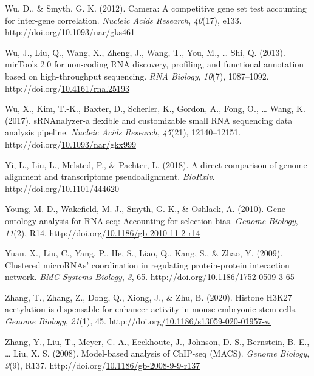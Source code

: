 \documentclass[12pt,twoside]{reedthesis}
\newlength{\cslhangindent}
\newenvironment{CSLReferences}[2] %
 {%
  \setlength{\parindent}{0pt}
  \ifodd #1 \everypar{\setlength{\hangindent}{\cslhangindent}}\ignorespaces\fi
  \ifnum #2 > 0
  \setlength{\parskip}{#2\baselineskip}
  \fi
 }%
 {}
\begin{document}
\begin{CSLReferences}{1}{0}
\leavevmode{}%
Wu, D., \& Smyth, G. K. (2012). Camera: A competitive gene set test accounting for inter-gene correlation. \emph{Nucleic Acids Research}, \emph{40}(17), e133. http://doi.org/\href{https://doi.org/10.1093/nar/gks461}{10.1093/nar/gks461}

\leavevmode{}%
Wu, J., Liu, Q., Wang, X., Zheng, J., Wang, T., You, M., \ldots{} Shi, Q. (2013). mirTools 2.0 for non-coding RNA discovery, profiling, and functional annotation based on high-throughput sequencing. \emph{RNA Biology}, \emph{10}(7), 1087--1092. http://doi.org/\href{https://doi.org/10.4161/rna.25193}{10.4161/rna.25193}

\leavevmode{}%
Wu, X., Kim, T.-K., Baxter, D., Scherler, K., Gordon, A., Fong, O., \ldots{} Wang, K. (2017). sRNAnalyzer-a flexible and customizable small RNA sequencing data analysis pipeline. \emph{Nucleic Acids Research}, \emph{45}(21), 12140--12151. http://doi.org/\href{https://doi.org/10.1093/nar/gkx999}{10.1093/nar/gkx999}

\leavevmode{}%
Yi, L., Liu, L., Melsted, P., \& Pachter, L. (2018). A direct comparison of genome alignment and transcriptome pseudoalignment. \emph{BioRxiv}. http://doi.org/\href{https://doi.org/10.1101/444620}{10.1101/444620}

\leavevmode{}%
Young, M. D., Wakefield, M. J., Smyth, G. K., \& Oshlack, A. (2010). Gene ontology analysis for RNA-seq: Accounting for selection bias. \emph{Genome Biology}, \emph{11}(2), R14. http://doi.org/\href{https://doi.org/10.1186/gb-2010-11-2-r14}{10.1186/gb-2010-11-2-r14}

\leavevmode{}%
Yuan, X., Liu, C., Yang, P., He, S., Liao, Q., Kang, S., \& Zhao, Y. (2009). Clustered microRNAs' coordination in regulating protein-protein interaction network. \emph{BMC Systems Biology}, \emph{3}, 65. http://doi.org/\href{https://doi.org/10.1186/1752-0509-3-65}{10.1186/1752-0509-3-65}

\leavevmode{}%
Zhang, T., Zhang, Z., Dong, Q., Xiong, J., \& Zhu, B. (2020). Histone H3K27 acetylation is dispensable for enhancer activity in mouse embryonic stem cells. \emph{Genome Biology}, \emph{21}(1), 45. http://doi.org/\href{https://doi.org/10.1186/s13059-020-01957-w}{10.1186/s13059-020-01957-w}

\leavevmode{}%
Zhang, Y., Liu, T., Meyer, C. A., Eeckhoute, J., Johnson, D. S., Bernstein, B. E., \ldots{} Liu, X. S. (2008). Model-based analysis of ChIP-seq (MACS). \emph{Genome Biology}, \emph{9}(9), R137. http://doi.org/\href{https://doi.org/10.1186/gb-2008-9-9-r137}{10.1186/gb-2008-9-9-r137}


\end{CSLReferences}
\end{document}
